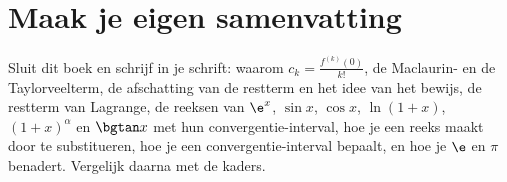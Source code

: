 
\ifzelfstudie
\section*{Maak je eigen samenvatting}
Sluit dit boek en schrijf in je schrift: waarom $c_k = \tfrac{f^{(k)}(0)}{k!}$, de Maclaurin- en de Taylorveelterm, de afschatting van de restterm en het idee van het bewijs, de restterm van Lagrange, de reeksen van $\e^x$, $\sin x$, $\cos x$, $\ln(1+x)$, $(1+x)^\alpha$ en $\bgtan x$ met hun convergentie-interval, hoe je een reeks maakt door te substitueren, hoe je een convergentie-interval bepaalt, en hoe je $\e$ en $\pi$ benadert. Vergelijk daarna met de kaders.
\fi
